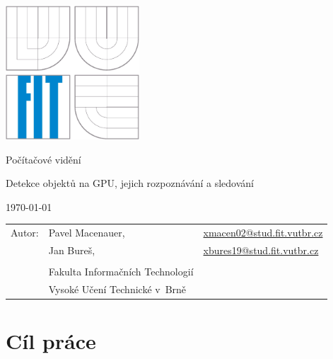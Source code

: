 \documentclass[12pt,a4paper,titlepage,final]{report}
\makeatletter
\newcommand\Course{Počítačové vidění}
\newcommand\WorkTitle{Detekce objektů na GPU, jejich rozpoznávání a sledování}
\newcommand\AuthorA{Pavel Macenauer}
\newcommand\AuthorB{Jan Bureš}
\newcommand\AuthorAEmail{xmacen02@stud.fit.vutbr.cz}
\newcommand\AuthorBEmail{xbures19@stud.fit.vutbr.cz}
\newcommand\Faculty{Fakulta Informačních Technologií}
\newcommand\School{Vysoké Učení Technické v~Brně}
\makeatother
\begin{document}
	\begin{titlepage}
	\begin{center}
		\includegraphics[height=5cm]{images/logo.eps}
	\end{center}
	\vfill
	\begin{center}
		\begin{Large}
			\Course\\
		\end{Large}
		\bigskip
		\begin{Huge}
			\WorkTitle\\
		\end{Huge}
	\end{center}
	\vfill
	\begin{center}
		\begin{large}
			\today
		\end{large}
	\end{center}
	\vfill
	\begin{flushleft}
		\begin{large}
			\begin{tabular}{lll}
				Autor: & \AuthorA, & \url{\AuthorAEmail} \\
				& \AuthorB, & \url{\AuthorBEmail} \\
		
				& & \\
				& \Faculty \\
				& \School \\
			\end{tabular}
		\end{large}
	\end{flushleft}
\end{titlepage}		

\tableofcontents

\newpage

\section{Cíl práce}
\end{document}
